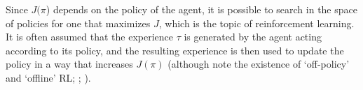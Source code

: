 Since $J(\pi$) depends on the policy of the agent, it is possible to search in the space of policies for one that maximizes $J$, which is the topic of reinforcement learning.
It is often assumed that the experience $\tau$ is generated by the agent acting according to its policy, and the resulting experience is then used to update the policy in a way that increases $J(\pi)$ (although note the existence of `off-policy' and `offline' RL; \citealp{levine2020offline}; ).



